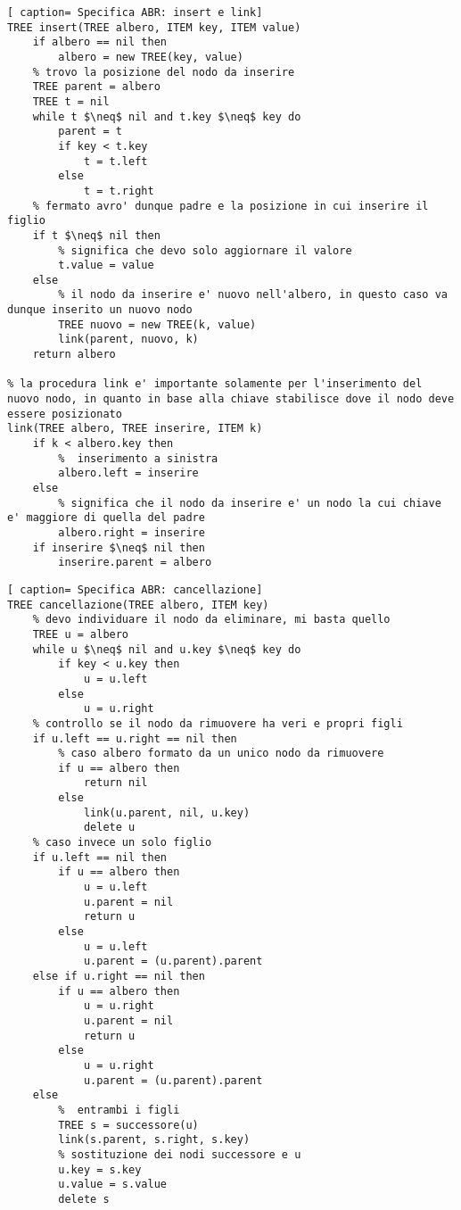 \documentclass[../cheatSheetAlgoritmi.tex]{subfiles}
\begin{document}
\newpage
\begin{lstlisting}[ caption= Specifica ABR: insert e link]
TREE insert(TREE albero, ITEM key, ITEM value)
	if albero == nil then
		albero = new TREE(key, value)
	% trovo la posizione del nodo da inserire
	TREE parent = albero
	TREE t = nil
	while t $\neq$ nil and t.key $\neq$ key do
	  	parent = t
		if key < t.key
    		t = t.left
		else 
			t = t.right
	% fermato avro' dunque padre e la posizione in cui inserire il figlio
	if t $\neq$ nil then
		% significa che devo solo aggiornare il valore
		t.value = value
	else
		% il nodo da inserire e' nuovo nell'albero, in questo caso va dunque inserito un nuovo nodo
		TREE nuovo = new TREE(k, value)
		link(parent, nuovo, k)
	return albero

% la procedura link e' importante solamente per l'inserimento del nuovo nodo, in quanto in base alla chiave stabilisce dove il nodo deve essere posizionato
link(TREE albero, TREE inserire, ITEM k)
	if k < albero.key then
		%  inserimento a sinistra
		albero.left = inserire
	else
		% significa che il nodo da inserire e' un nodo la cui chiave e' maggiore di quella del padre
		albero.right = inserire
	if inserire $\neq$ nil then
		inserire.parent = albero
\end{lstlisting}
\newpage
\begin{lstlisting}[ caption= Specifica ABR: cancellazione]
TREE cancellazione(TREE albero, ITEM key)
	% devo individuare il nodo da eliminare, mi basta quello
	TREE u = albero
	while u $\neq$ nil and u.key $\neq$ key do
		if key < u.key then
			u = u.left
		else
			u = u.right
	% controllo se il nodo da rimuovere ha veri e propri figli
	if u.left == u.right == nil then
		% caso albero formato da un unico nodo da rimuovere
		if u == albero then
			return nil
		else
			link(u.parent, nil, u.key)
			delete u
	% caso invece un solo figlio
	if u.left == nil then 
		if u == albero then 
			u = u.left
			u.parent = nil
			return u
		else
			u = u.left
			u.parent = (u.parent).parent
	else if u.right == nil then 
		if u == albero then 
			u = u.right
			u.parent = nil
			return u
		else
			u = u.right
			u.parent = (u.parent).parent
	else 
		%  entrambi i figli
		TREE s = successore(u)
		link(s.parent, s.right, s.key)
		% sostituzione dei nodi successore e u
		u.key = s.key
		u.value = s.value
		delete s
\end{lstlisting}
\newpage
\end{document}
